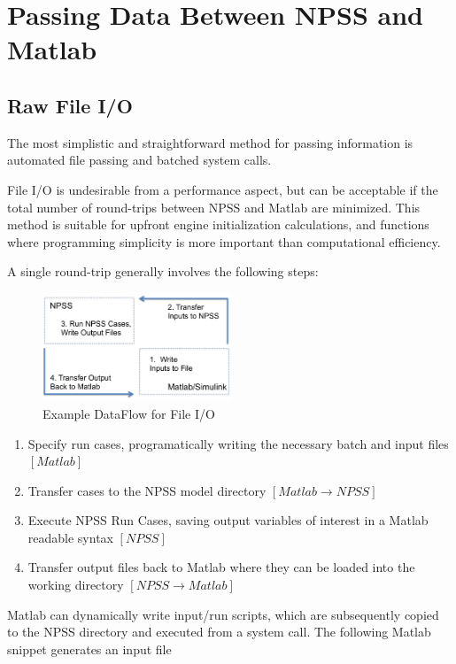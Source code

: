 \documentclass[heading.tex]{subfiles}
\begin{document}
\section{Passing Data Between NPSS and Matlab}
\subsection{Raw File I/O}

The most simplistic and straightforward method for passing information is automated
file passing and batched system calls.

File I/O is undesirable from a performance aspect, but can be acceptable if the total number of round-trips between
NPSS and Matlab are minimized. This method is suitable for upfront engine initialization calculations, 
and functions where programming simplicity is more important than computational efficiency.

A single round-trip generally involves the following steps:

\begin{figure}[H]
\centering
\includegraphics[width=0.5\textwidth]{images/roundTrip}
\caption{Example DataFlow for File I/O}
\label{f:roundTrip}
\end{figure}

\begin{enumerate}
  \item Specify run cases, programatically writing the necessary batch and input files $[Matlab]$
  \item Transfer cases to the NPSS model directory $[Matlab \rightarrow NPSS]$
  \item Execute NPSS Run Cases, saving output variables of interest in a Matlab readable syntax $[NPSS]$
  \item Transfer output files back to Matlab where they can be loaded into the working directory $[NPSS \rightarrow Matlab]$
\end{enumerate}


Matlab can dynamically write input/run scripts, which are subsequently
copied to the NPSS directory and executed from a system call.
The following Matlab snippet generates an input file
\end{document}
